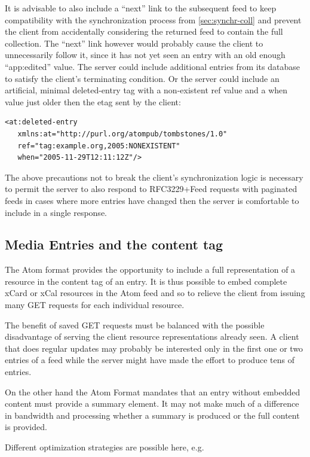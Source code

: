 \documentclass[12pt,a4paper,twoside]{scrartcl}		%
\begin{document}
It is advisable to also include a ``next'' link to the subsequent feed to keep
compatibility with the synchronization process from \autoref{sec:synchr-coll}
and prevent the client from accidentally considering the returned feed to
contain the full collection. The ``next'' link however would probably cause the
client to unnecessarily follow it, since it has not yet seen an entry with an
old enough ``app:edited'' value. The server could include additional entries
from its database to satisfy the client's terminating condition. Or the server
could include an artificial, minimal
deleted-entry\cite{draft-snell-atompub-tombstones-14} tag with a non-existent
ref value and a when value just older then the etag sent by the client:
\begin{lstlisting}
<at:deleted-entry
   xmlns:at="http://purl.org/atompub/tombstones/1.0"
   ref="tag:example.org,2005:NONEXISTENT"
   when="2005-11-29T12:11:12Z"/>
\end{lstlisting}
The above precautions not to break the client's synchronization logic is
necessary to permit the server to also respond to RFC3229+Feed requests with
paginated feeds in cases where more entries have changed then the server is
comfortable to include in a single response.

\subsection{Media Entries and the content tag}
\label{sec:inline-feeds-or}

The Atom format provides the opportunity to include a full representation of a
resource in the content tag of an entry\cite[sec. 4.1.3]{RFC4287}. It is thus
possible to embed complete xCard or xCal resources in the Atom feed
and so to relieve the client from issuing many GET requests for each individual
resource.

The benefit of saved GET requests must be balanced with the possible
disadvantage of serving the client resource representations already seen. A
client that does regular updates may probably be interested only in the first
one or two entries of a feed while the server might have made the effort to
produce tens of entries.

On the other hand the Atom Format mandates that an entry without embedded
content must provide a summary element. It may not make much of a difference in
bandwidth and processing whether a summary is produced or the full content is
provided.

Different optimization strategies are possible here, e.g.
\end{document}
